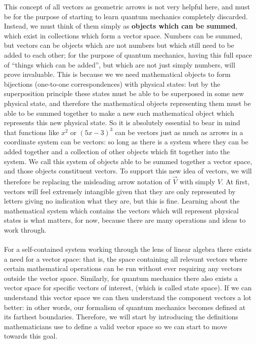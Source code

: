 This concept of all vectors as geometric arrows is not very helpful here, and must be for the purpose of starting to learn quantum mechanics completely discarded. Instead, we must think of them simply as \textbf{objects which can be summed}, which exist in collections which form a vector space. Numbers can be summed, but vectors can be objects which are not numbers but which still need to be added to each other; for the purpose of quantum mechanics, having this full space of ``things which can be added'', but which are not just simply numbers, will prove invaluable. This is because we we need mathematical objects to form bijections (one-to-one correspondences) with physical states: but by the superposition principle these states must be able to be superposed in some new physical state, and therefore the mathematical objects representing them must be able to be summed together to make a new such mathematical object which represents this new physical state. So it is absolutely essential to bear in mind that functions like $x^2$ or $(5x-3)^{3}$ can be vectors just as much as arrows in a coordinate system can be vectors: so long as there is a system where they can be added together and a collection of other objects which fit together into the system. We call this system of objects able to be summed together a vector space, and those objects constituent vectors. To support this new idea of vectors, we will therefore be replacing the misleading arrow notation of $\vec{V}$  with simply ${V}$. At first, vectors will feel extremely intangible given that they are only represented by letters giving no indication what they are, but this is fine. Learning about the mathematical system which contains the vectors which will represent physical states is what matters, for now, because there are many operations and ideas to work through.
\\\\
For a self-contained system working through the lens of linear algebra there exists a need for a vector space: that is, the space containing all relevant vectors where certain mathematical operations can be run without ever requiring any vectors outside the vector space. Similarly, for quantum mechanics there also exists a vector space for specific vectors of interest, (which is called state space). If we can understand this vector space we can then understand the component vectors a lot better: in other words, our formalism of quantum mechanics becomes defined at its farthest boundaries. Therefore, we will start by introducing the definitions mathematicians use to define a valid vector space so we can start to move towards this goal. 
